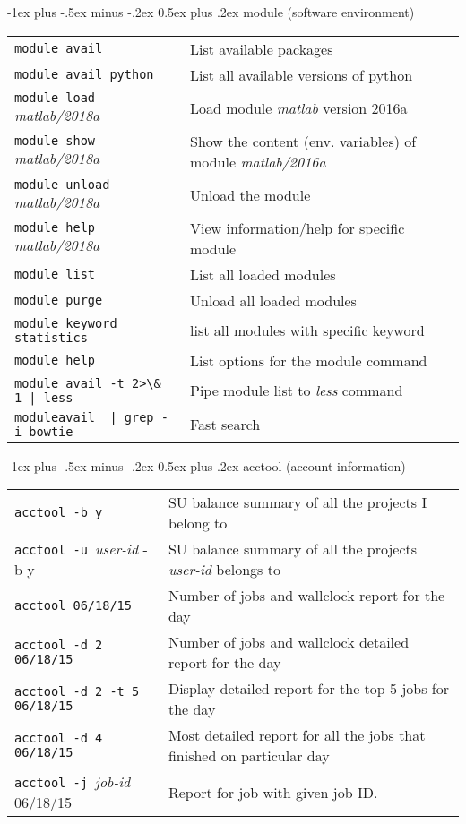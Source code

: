 \documentclass[10pt,landscape]{article}
\makeatletter
\renewcommand{\section}{\@startsection{section}{1}{0mm}%
                                {-1ex plus -.5ex minus -.2ex}%
                                {0.5ex plus .2ex}%
                                {\normalfont\large\bfseries}}
\makeatother
\begin{document}
\begin{multicols*}{2}
\section{module (software environment)}
\begin{tabular}{@{}ll@{}}
\verb!module avail!   & List available packages \\
\verb!module avail python!   & List all available versions of python \\
\verb!module load !\textit{matlab/2018a}    & Load module \textit{matlab} version 2016a \\
\verb!module show !\textit{matlab/2018a}    & Show the content (env. variables) of module \textit{matlab/2016a} \\
\verb!module unload !\textit{matlab/2018a}    & Unload the module\\ 
\verb!module help !\textit{matlab/2018a}    & View information/help for specific module\\ 
\verb!module list !    & List all loaded modules\\
\verb!module purge !    & Unload all loaded modules\\
\verb!module keyword statistics  !    & list all modules with specific keyword\\
\verb!module help !    & List options for the module command\\
\verb!module avail -t 2>\& 1 | less!   & Pipe module list to \textit{less} command\\
\verb!moduleavail  | grep -i bowtie!   & Fast search \\
\end{tabular}

\vspace{15pt}

\section{acctool (account information) }
\begin{tabular}{@{}ll@{}}
\verb!acctool -b y!   & SU balance summary of all the projects I belong to \\
\verb!acctool -u !\textit{user-id} -b y   & SU balance summary of all the projects \textit{user-id} belongs to \\
\verb!acctool 06/18/15!   & Number of jobs and wallclock report for the day \\
\verb!acctool -d 2 06/18/15!   & Number of jobs and wallclock detailed report for the day \\
\verb!acctool -d 2 -t 5 06/18/15!   & Display detailed report for the top 5 jobs for the day \\
\verb!acctool -d 4 06/18/15!   & Most detailed report for all the jobs that finished on particular day \\
\verb!acctool -j !\textit{job-id} 06/18/15  & Report for job with given job ID. \\
\end{tabular}


\end{multicols*}
\end{document}
